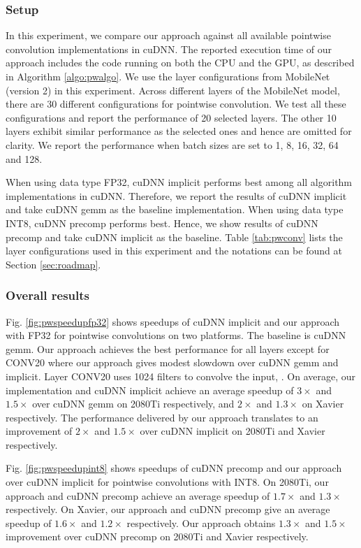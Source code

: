 \subsubsection{Setup} In this experiment, we compare our approach against all available pointwise convolution implementations in cuDNN.
The reported execution time of our approach includes the code running on both the CPU and the GPU, as described in Algorithm
\ref{algo:pwalgo}. We use the layer configurations from MobileNet (version 2) in this experiment. Across different layers of the MobileNet
model, there are 30 different configurations for pointwise convolution. We test all these configurations and report the performance of 20
selected layers. The other 10 layers exhibit similar performance as the selected ones and hence are omitted for clarity. We report the
performance when batch sizes are set to 1, 8, 16, 32, 64 and 128.

When using data type FP32, cuDNN implicit performs best among all algorithm implementations in cuDNN. Therefore, we report the results of
cuDNN implicit and take cuDNN gemm as the baseline implementation. When using data type INT8, cuDNN precomp performs best. Hence, we show
results of cuDNN precomp and take cuDNN implicit as the baseline. Table \ref{tab:pwconv} lists the layer configurations used in this
experiment and  the notations can be found at Section \ref{sec:roadmap}.

\subsubsection{Overall results}
  Fig. \ref{fig:pwspeedupfp32} shows speedups of cuDNN implicit and our approach with FP32  for pointwise
convolutions on two platforms. The baseline is cuDNN gemm. Our approach achieves the best performance for all layers except for CONV20 where
our approach gives modest slowdown over cuDNN gemm and implicit. Layer CONV20 uses 1024 filters to convolve the input, . On average, our implementation and cuDNN implicit achieve an average speedup of $3\times$ and
$1.5\times$ over cuDNN gemm on 2080Ti respectively, and $2\times$ and $1.3\times$ on Xavier respectively. The performance delivered by our
approach translates to an improvement of $2\times$ and $1.5\times$ over cuDNN implicit on 2080Ti and Xavier respectively.

  Fig. \ref{fig:pwspeedupint8} shows speedups of cuDNN precomp and our approach over cuDNN implicit for
pointwise convolutions with INT8. On 2080Ti, our approach and cuDNN precomp achieve an average speedup of $1.7\times$ and $1.3\times$
respectively. On Xavier, our approach and cuDNN precomp give an average speedup of $1.6\times$ and $1.2\times$ respectively. Our approach
obtains $1.3\times$ and $1.5\times$ improvement over cuDNN precomp on 2080Ti and Xavier respectively.


